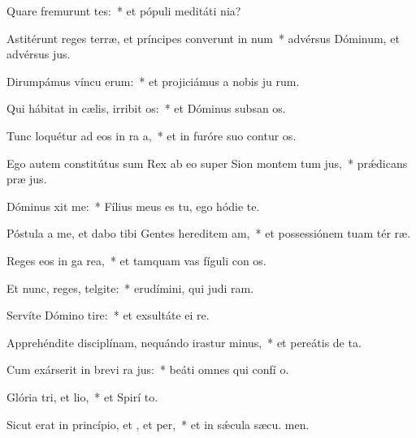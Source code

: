 \item Quare fremurunt tes:~* et pópuli meditáti  nia?
\item Astitérunt reges terræ, et príncipes converunt in num~* advérsus Dóminum, et advérsus  jus.
\item Dirumpámus víncu erum:~* et projiciámus a nobis ju rum.
\item Qui hábitat in cælis, irribit os:~* et Dóminus subsan os.
\item Tunc loquétur ad eos in ra a,~* et in furóre suo contur os.
\item Ego autem constitútus sum Rex ab eo super Sion montem tum jus,~* prǽdicans præ jus.
\item Dóminus xit  me:~* Fílius meus es tu, ego hódie  te.
\item Póstula a me, et dabo tibi Gentes hereditem am,~* et possessiónem tuam tér ræ.
\item Reges eos in ga rea,~* et tamquam vas fíguli con os.
\item Et nunc, reges, telgite:~* erudímini, qui judi ram.
\item Servíte Dómino  tire:~* et exsultáte ei  re.
\item Apprehéndite disciplínam, nequándo irastur minus,~* et pereátis de  ta.
\item Cum exárserit in brevi ra jus:~* beáti omnes qui confí  o.
\item Glória tri, et lio,~* et Spirí to.
\item Sicut erat in princípio, et , et per,~* et in sǽcula sæcu. men.
